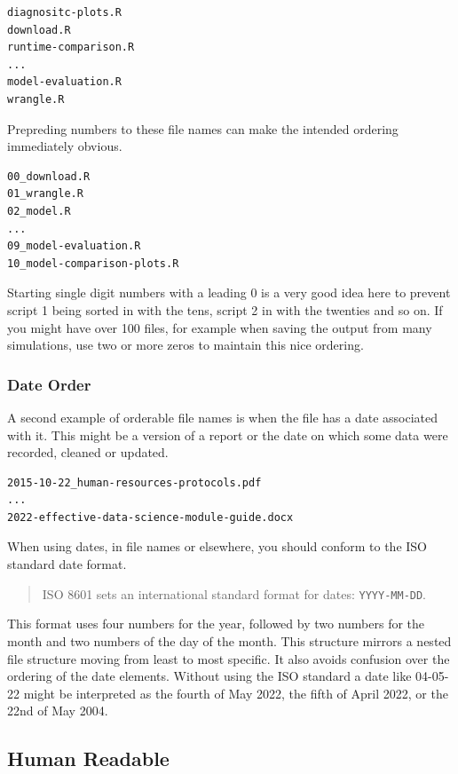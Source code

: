\documentclass[
  12pt,
]{book}
\begin{document}
\begin{verbatim}
diagnositc-plots.R
download.R
runtime-comparison.R
...
model-evaluation.R
wrangle.R
\end{verbatim}

Prepreding numbers to these file names can make the intended ordering immediately obvious.

\begin{verbatim}
00_download.R
01_wrangle.R
02_model.R
...
09_model-evaluation.R
10_model-comparison-plots.R
\end{verbatim}

Starting single digit numbers with a leading 0 is a very good idea here to prevent script 1 being sorted in with the tens, script 2 in with the twenties and so on. If you might have over 100 files, for example when saving the output from many simulations, use two or more zeros to maintain this nice ordering.

\hypertarget{date-order}{%
\subsubsection{Date Order}\label{date-order}}

A second example of orderable file names is when the file has a date associated with it. This might be a version of a report or the date on which some data were recorded, cleaned or updated.

\begin{verbatim}
2015-10-22_human-resources-protocols.pdf
...
2022-effective-data-science-module-guide.docx
\end{verbatim}

When using dates, in file names or elsewhere, you should conform to the ISO standard date format.

\begin{quote}
ISO 8601 sets an international standard format for dates: \texttt{YYYY-MM-DD}.
\end{quote}

This format uses four numbers for the year, followed by two numbers for the month and two numbers of the day of the month. This structure mirrors a nested file structure moving from least to most specific. It also avoids confusion over the ordering of the date elements. Without using the ISO standard a date like 04-05-22 might be interpreted as the fourth of May 2022, the fifth of April 2022, or the 22nd of May 2004.

\hypertarget{human-readable}{%
\subsection{Human Readable}\label{human-readable}}
\end{document}

